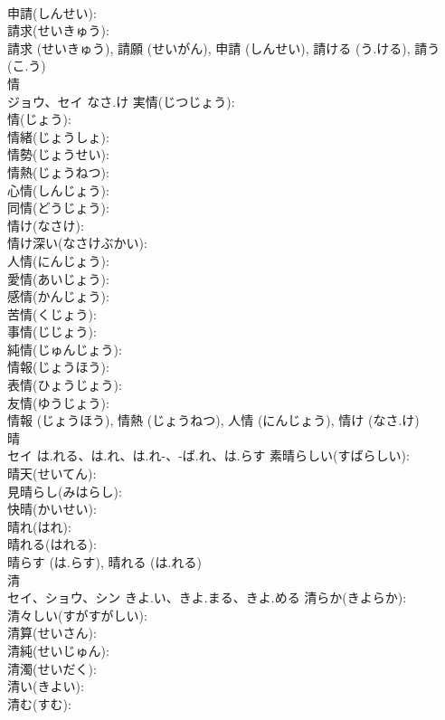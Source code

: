 \documentclass[8pt]{extreport}
\begin{document}
\begin{CJK}{UTF8}{min}
\\	申請(しんせい): 
\\	請求(せいきゅう): 
\\	請求 (せいきゅう), 請願 (せいがん), 申請 (しんせい), 請ける (う.ける), 請う (こ.う)
\\	情			
\\	ジョウ、セイ	なさ.け	実情(じつじょう): 
\\	情(じょう): 
\\	情緒(じょうしょ): 
\\	情勢(じょうせい): 
\\	情熱(じょうねつ): 
\\	心情(しんじょう): 
\\	同情(どうじょう): 
\\	情け(なさけ): 
\\	情け深い(なさけぶかい): 
\\	人情(にんじょう): 
\\	愛情(あいじょう): 
\\	感情(かんじょう): 
\\	苦情(くじょう): 
\\	事情(じじょう): 
\\	純情(じゅんじょう): 
\\	情報(じょうほう): 
\\	表情(ひょうじょう): 
\\	友情(ゆうじょう): 
\\	情報 (じょうほう), 情熱 (じょうねつ), 人情 (にんじょう), 情け (なさ.け)
\\	晴			
\\	セイ	は.れる、は.れ、は.れ-、-ば.れ、は.らす	素晴らしい(すばらしい): 
\\	晴天(せいてん): 
\\	見晴らし(みはらし): 
\\	快晴(かいせい): 
\\	晴れ(はれ): 
\\	晴れる(はれる): 
\\	晴らす (は.らす), 晴れる (は.れる)
\\	清			
\\	セイ、ショウ、シン	きよ.い、きよ.まる、きよ.める	清らか(きよらか): 
\\	清々しい(すがすがしい): 
\\	清算(せいさん): 
\\	清純(せいじゅん): 
\\	清濁(せいだく): 
\\	清い(きよい): 
\\	清む(すむ): 

\end{CJK}
\end{document}
